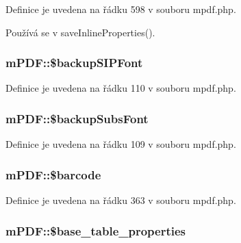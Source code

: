 Definice je uvedena na řádku 598 v souboru mpdf.\-php.



Používá se v save\-Inline\-Properties().

\hypertarget{classm_p_d_f_ab953573673e5ac9b13c12add4dfce942}{
\subsubsection[{\$backup\-S\-I\-P\-Font}]{\setlength{\rightskip}{0pt plus 5cm}m\-P\-D\-F\-::\$backup\-S\-I\-P\-Font}}\label{classm_p_d_f_ab953573673e5ac9b13c12add4dfce942}


Definice je uvedena na řádku 110 v souboru mpdf.\-php.

\hypertarget{classm_p_d_f_ae414cef3ea1d358071457c23ffa61da9}{
\subsubsection[{\$backup\-Subs\-Font}]{\setlength{\rightskip}{0pt plus 5cm}m\-P\-D\-F\-::\$backup\-Subs\-Font}}\label{classm_p_d_f_ae414cef3ea1d358071457c23ffa61da9}


Definice je uvedena na řádku 109 v souboru mpdf.\-php.

\hypertarget{classm_p_d_f_adff8602e70eabc32146ffe70768c0bc8}{
\subsubsection[{\$barcode}]{\setlength{\rightskip}{0pt plus 5cm}m\-P\-D\-F\-::\$barcode}}\label{classm_p_d_f_adff8602e70eabc32146ffe70768c0bc8}


Definice je uvedena na řádku 363 v souboru mpdf.\-php.

\hypertarget{classm_p_d_f_a49fc966545b50243ed2d6dc27a02f009}{
\subsubsection[{\$base\-\_\-table\-\_\-properties}]{\setlength{\rightskip}{0pt plus 5cm}m\-P\-D\-F\-::\$base\-\_\-table\-\_\-properties}}\label{classm_p_d_f_a49fc966545b50243ed2d6dc27a02f009}


